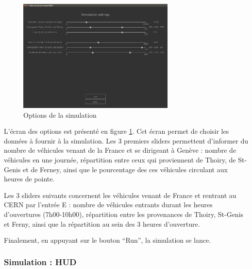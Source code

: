 \documentclass[a4paper,11pt, titlepage]{extarticle}
\begin{document}
\begin{figure}[!h]
  \begin{center}
    \includegraphics[width=0.7\textwidth]{interface_settings.png}
  \end{center}
  \caption{Options de la simulation}
  \label{imgSettings}
\end{figure}

L'écran des options est présenté en figure \ref{imgSettings}. Cet écran permet de choisir les données à fournir à la simulation. Les 3 premiers sliders permettent d'informer du nombre de véhicules venant de la France et se dirigeant à Genève : nombre de véhicules en une journée, répartition entre ceux qui proviennent de Thoiry, de St-Genis et de Ferney, ainsi que le pourcentage des ces véhicules circulant aux heures de pointe.

Les 3 sliders suivants concernent les véhicules venant de France et rentrant au CERN par l'entrée E : nombre de véhicules entrants durant les heures d'ouvertures (7h00-10h00), répartition entre les provenances de Thoiry, St-Genis et Ferny, ainsi que la répartition au sein des 3 heures d'ouverture.

Finalement, en appuyant sur le bouton ``Run'', la simulation se lance.

\subsubsection{Simulation : HUD}
\end{document}
